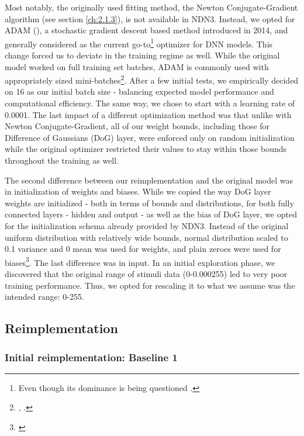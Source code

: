 Most notably, the originally used fitting method, the Newton Conjugate-Gradient algorithm (see section \ref{ch:2.1.3}), is not available in NDN3. Instead, we opted for ADAM (\cite{kingma2014adam}), a stochastic gradient descent based method introduced in 2014, and generally considered as the current go-to\footnote{Even though its dominance is being questioned \cite{2019arXiv191005446C}.} optimizer for DNN models. This change forced us to deviate in the training regime as well. While the original model worked on full training set batches, ADAM is commonly used with appropriately sized mini-batches\footnote{\cite{2017arXiv170508741H}, \cite{2017arXiv171100489S}.}. After a few initial tests, we empirically decided on 16 as our initial batch size - balancing expected model performance and computational efficiency. The same way, we chose to start with a learning rate of 0.0001. The last impact of a different optimization method was that unlike with Newton Conjugate-Gradient, all of our weight bounds, including those for Difference of Gaussians (DoG) layer, were enforced only on random initialization while the original optimizer restricted their values to stay within those bounds throughout the training as well.

The second difference between our reimplementation and the original model was in initialization of weights and biases. While we copied the way DoG layer weights are initialized - both in terms of bounds and distributions, for both fully connected layers - hidden and output - as well as the bias of DoG layer, we opted for the initialization schema already provided by NDN3. Instead of the original uniform distribution with relatively wide bounds, normal distribution scaled to 0.1 variance and 0 mean was used for weights, and plain zeroes were used for biases\footnote{\cite{glorot}}. The last difference was in input. In an initial exploration phase, we discovered that the original range of stimuli data (0-0.000255) led to very poor training performance. Thus, we opted for rescaling it to what we assume was the intended range: 0-255.

\subsection{Reimplementation}
\subsubsection{Initial reimplementation: Baseline 1}

